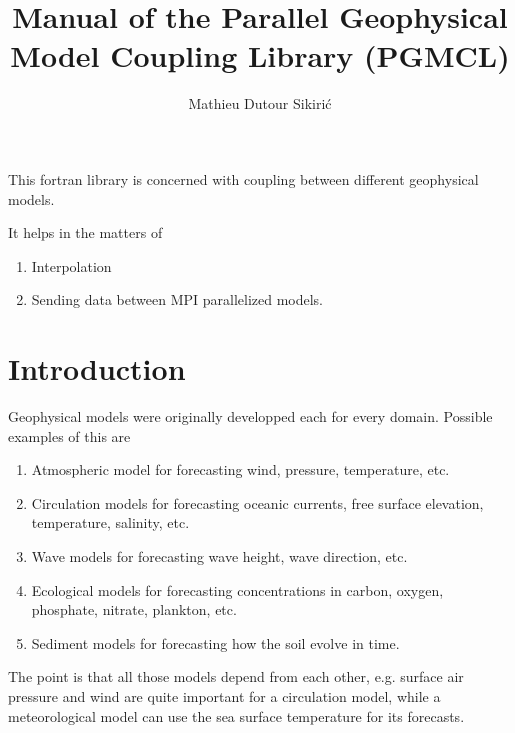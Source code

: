 \documentclass[12pt]{article}
\title{Manual of the Parallel Geophysical Model Coupling Library (PGMCL)}
\author{Mathieu Dutour Sikiri\'c}
\begin{document}
\newcommand{\RR}{\ensuremath{\mathbb{R}}}
\newcommand{\NN}{\ensuremath{\mathbb{N}}}
\newcommand{\QQ}{\ensuremath{\mathbb{Q}}}
\newcommand{\CC}{\ensuremath{\mathbb{C}}}
\newcommand{\ZZ}{\ensuremath{\mathbb{Z}}}
\newcommand{\TT}{\ensuremath{\mathbb{T}}}
\newtheorem{proposition}{Proposition}
\newtheorem{theorem}{Theorem}
\newtheorem{corollary}{Corollary}
\newtheorem{lemma}{Lemma}
\newtheorem{problem}{Problem}
\newtheorem{conjecture}{Conjecture}
\newtheorem{claim}{Claim}
\newtheorem{remark}{Remark}
\newtheorem{definition}{Definition}
\newcommand{\qed}{\hfill $\Box$ }
\newcommand{\proof}{\noindent{\bf Proof.}\ \ }



\maketitle

This fortran library is concerned with coupling between different
geophysical models.

It helps in the matters of
\begin{enumerate}
\item Interpolation
\item Sending data between MPI parallelized models.
\end{enumerate}


\section{Introduction}

Geophysical models were originally developped each for every domain. Possible examples of this are
\begin{enumerate}
\item Atmospheric model for forecasting wind, pressure, temperature, etc.
\item Circulation models for forecasting oceanic currents, free surface elevation, temperature, salinity, etc.
\item Wave models for forecasting wave height, wave direction, etc.
\item Ecological models for forecasting concentrations in carbon, oxygen, phosphate, nitrate, plankton, etc.
\item Sediment models for forecasting how the soil evolve in time.
\end{enumerate}

The point is that all those models depend from each other, e.g. surface air pressure and wind are quite important for a circulation model, while a meteorological model can use the sea surface temperature for its forecasts.
\end{document}
